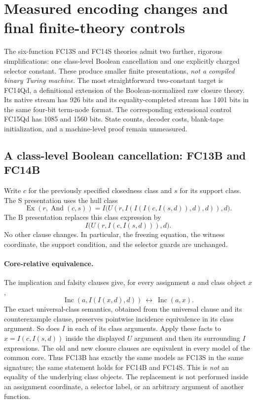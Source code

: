 \section{Measured encoding changes and final finite-theory controls}
\label{sec:encoding-controls}

The six-function FC13S and FC14S theories admit two further, rigorous
simplifications: one class-level Boolean cancellation and one explicitly
charged selector constant.  These produce smaller finite presentations,
\emph{not a compiled binary Turing machine}.  The most straightforward
two-constant target is FC14Qd, a definitional extension of the Boolean-normalized
raw closure theory.  Its native stream has 926 bits and its equality-completed
stream has 1401 bits in the same four-bit term-node format.  The corresponding
extensional control FC15Qd has 1085 and 1560 bits.  State counts, decoder costs,
blank-tape initialization, and a machine-level proof remain unmeasured.

\subsection{A class-level Boolean cancellation: FC13B and FC14B}

Write $c$ for the previously specified closedness class and $s$ for its support
class.  The S presentation uses the hull class
\[
 \operatorname{Ex}(r,\operatorname{And}(c,s))
 =I\bigl(U(r,I(I(I(c,I(s,d)),d),d)),d\bigr).
\]
The B presentation replaces this class expression by
\[
 \boxed{I\bigl(U(r,I(c,I(s,d))),d\bigr).}
\]
No other clause changes.  In particular, the freezing equation, the witness
coordinate, the support condition, and the selector guards are unchanged.

\paragraph{Core-relative equivalence.}
The implication and falsity clauses give, for every assignment $a$ and class
object $x$,
\[
 \operatorname{Inc}(a,I(I(x,d),d))
 \ \longleftrightarrow\ \operatorname{Inc}(a,x).
\]
The exact universal-class semantics, obtained from the universal clause and
its counterexample clause, preserves pointwise incidence equivalence in its
class argument.  So does $I$ in each of its class arguments.  Apply these facts
to $x=I(c,I(s,d))$ inside the displayed $U$ argument and then its surrounding
$I$ expressions.  The old and new closure clauses are equivalent in every
model of the common core.  Thus FC13B has exactly the same models as FC13S in
the same signature; the same statement holds for FC14B and FC14S.  This is
\emph{not} an equality of the underlying class objects.  The replacement is
not performed inside an assignment coordinate, a selector label, or an
arbitrary argument of another function.

